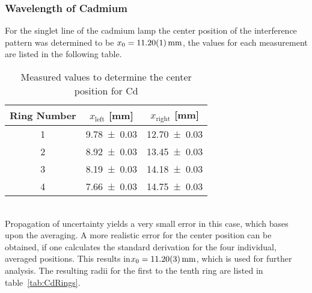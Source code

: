 \subsubsection{Wavelength of Cadmium}
\label{toc:WavelengthCd}
For the singlet line of the cadmium lamp the center position of the interference pattern was determined to be $x_0 = \SI{11.20 \pm 0.01}{\mm}$, the values for each measurement are listed in the following table.
\begin{table}[ht]
	\centering
	\begin{tabular}{c c c}
	Ring Number		& $x_\text{left}$ [\si{\mm}]	& $x_\text{right}$ [\si{\mm}]	\\
	\hline
	1			& \num{9.78 \pm 0.03}	 	& \num{12.70 \pm 0.03}		 \\
	2			& \num{8.92 \pm 0.03} 		& \num{13.45 \pm 0.03}		 \\
	3			& \num{8.19 \pm 0.03} 		& \num{14.18 \pm 0.03} 		\\
	4			& \num{7.66 \pm 0.03} 		& \num{14.75 \pm 0.03} 		\\
	\end{tabular}
	\caption[Measurement - Center Position Cd]{Measured values to determine the center position for Cd}
	\label{tab:CdCenter}
\end{table}\\
Propagation of uncertainty yields a very small error in this case, which bases upon the averaging. 
A more realistic error for the center position can be obtained, if one calculates the standard derivation for the four individual, averaged positions. 
This results in\linebreak $x_0 = \SI{11.20 \pm 0.03}{\mm}$, which is used for further analysis. 
The resulting radii for the first to the tenth ring are listed in table~\ref{tab:CdRings}. 

